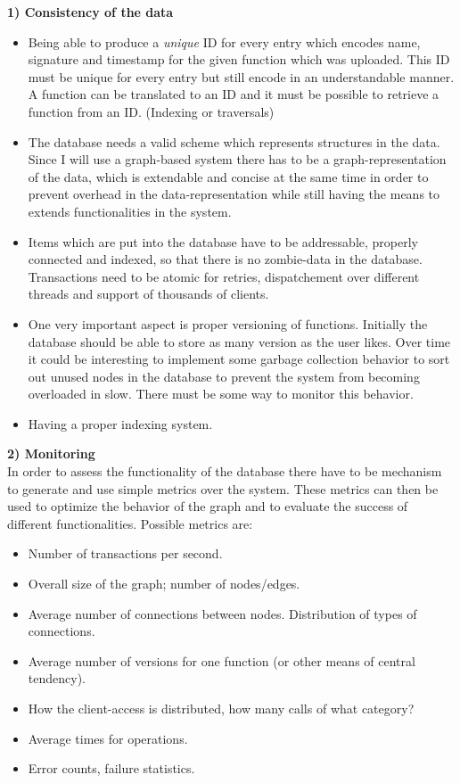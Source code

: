 \documentclass[twoside, 11pt]{scrartcl}
\begin{document}
\textbf{1) Consistency of the data}
\begin{itemize}
	\item Being able to produce a \emph{unique} ID for every entry which encodes name, signature and timestamp for the given function which was uploaded. This ID must be unique for every entry but still encode in an understandable manner. A function can be translated to an ID and it must be possible to retrieve a function from an ID. (Indexing or traversals) 
	\item The database needs a valid scheme which represents structures in the data. Since I will use a graph-based system there has to be a graph-representation of the data, which is extendable and concise at the same time in order to prevent overhead in the data-representation while still having the means to extends functionalities in the system.
	\item Items which are put into the database have to be addressable, properly connected and indexed, so that there is no zombie-data in the database. Transactions need to be atomic for retries, dispatchement over different threads and support of thousands of clients. 
	\item One very important aspect is proper versioning of functions. Initially the database should be able to store as many version as the user likes. Over time it could be interesting to implement some garbage collection behavior to sort out unused nodes in the database to prevent the system from becoming overloaded in slow. There must be some way to monitor this behavior.
	\item Having a proper indexing system.
\end{itemize}

\textbf{2) Monitoring}\\
In order to assess the functionality of the database there have to be mechanism to generate and use simple metrics over the system. These metrics can then be used to optimize the behavior of the graph and to evaluate the success of different functionalities. Possible metrics are:
\begin{itemize}
	\item Number of transactions per second.
	\item Overall size of the graph; number of nodes/edges.
	\item Average number of connections between nodes. Distribution of types of connections.
	\item Average number of versions for one function (or other means of central tendency).
	\item How the client-access is distributed, how many calls of what category?
	\item Average times for operations.
	\item Error counts, failure statistics.
\end{itemize}
\end{document}
